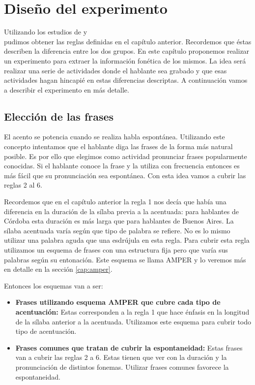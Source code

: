 \chapter{Diseño del experimento}

Utilizando los estudios de \cite{Fontanella2000} y \\ \cite{Vidal1964} pudimos obtener las reglas definidas en el capítulo anterior. Recordemos que éstas describen la diferencia entre los dos grupos. En este capítulo proponemos realizar un experimento para extraer la información fonética de los mismos. La idea será realizar una serie de actividades donde el hablante sea grabado y que esas actividades hagan hincapié en estas diferencias descriptas. A continuación vamos a describir el experimento en más detalle.

\section{Elección de las frases}

El acento se potencia cuando se realiza habla espontánea. Utilizando este concepto intentamos que el hablante diga las frases de la forma más natural posible. Es por ello que elegimos como actividad pronunciar frases popularmente conocidas. Si el hablante conoce la frase y la utiliza con frecuencia entonces es más fácil que su pronunciación sea espontánea. Con esta idea vamos a cubrir las reglas 2 al 6. 

Recordemos que en el capítulo anterior la regla 1 nos decía que había una diferencia en la duración de la sílaba previa a la acentuada: para hablantes de Córdoba esta duración es más larga que para hablantes de Buenos Aires. La sílaba acentuada varía según que tipo de palabra se refiere. No es lo mismo utilizar una palabra aguda que una esdrújula en esta regla. Para cubrir esta regla utilizamos un esquema de frases con una estructura fija pero que varía sus palabras según su entonación. Este esquema se llama AMPER \cite{amper2004,amper} y lo veremos más en detalle en la sección \ref{cap:amper}.

Entonces los esquemas van a ser: 

\begin{itemize}
  \item \textbf{Frases utilizando esquema AMPER que cubre cada tipo de acentuación:} Estas corresponden a la regla 1 que hace énfasis en la longitud de la sílaba anterior a la acentuada. Utilizamos este esquema para cubrir todo tipo de acentuación.
  \item \textbf{Frases comunes que tratan de cubrir la espontaneidad:} Estas frases van a cubrir las reglas 2 a 6. Estas tienen que ver con la duración y la pronunciación de distintos fonemas. Utilizar frases comunes favorece la espontaneidad.
\end{itemize}


